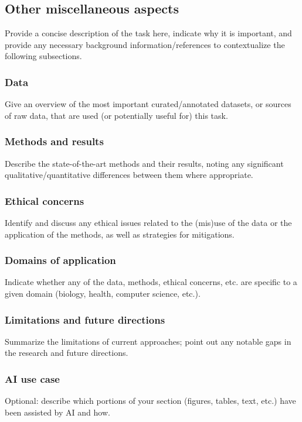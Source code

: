 \subsection{Other miscellaneous aspects}

Provide a concise description of the task here, indicate why it is important, and provide any necessary background information/references to contextualize the following subsections.

\subsubsection{Data}

Give an overview of the most important curated/annotated datasets, or sources of raw data, that are used (or potentially useful for) this task.

\subsubsection{Methods and results}

Describe the state-of-the-art methods and their results, noting any significant qualitative/quantitative differences between them where appropriate.



\subsubsection{Ethical concerns}

Identify and discuss any ethical issues related to the (mis)use of the data or the application of the methods, as well as strategies for mitigations.

\subsubsection{Domains of application}

Indicate whether any of the data, methods, ethical concerns, etc. are specific to a given domain (biology, health, computer science, etc.).

\subsubsection{Limitations and future directions}

Summarize the limitations of current approaches; point out any notable gaps in the research and future directions.

\subsubsection{AI use case}

Optional: describe which portions of your section (figures, tables, text, etc.) have been assisted by AI and how.
